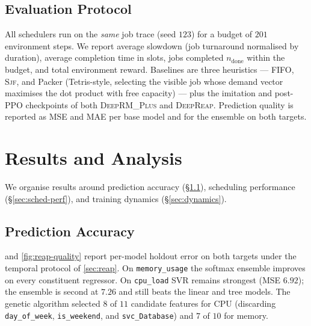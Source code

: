 \documentclass[runningheads]{llncs}
\newcommand{\deeprm}{\textsc{DeepRM\_Plus}}
\newcommand{\deepreap}{\textsc{DeepReap}}
\newcommand{\sjf}{\textsc{Sjf}}
\begin{document}
\subsection{Evaluation Protocol}\label{sec:metrics}
All schedulers run on the \emph{same} job trace (seed $123$) for a
budget of $201$ environment steps. We report average slowdown (job
turnaround normalised by duration), average completion time in slots,
jobs completed $n_{\text{done}}$ within the budget, and total
environment reward. Baselines are three heuristics --- FIFO, \sjf{}, and
Packer (Tetris-style, selecting the visible job whose demand vector
maximises the dot product with free capacity) --- plus the imitation and
post-PPO checkpoints of both \deeprm{} and \deepreap{}. Prediction
quality is reported as MSE and MAE per base model and for the ensemble
on both targets.

\section{Results and Analysis}
We organise results around prediction accuracy
(\S\ref{sec:pred-perf}), scheduling performance
(\S\ref{sec:sched-perf}), and training dynamics
(\S\ref{sec:dynamics}).

\subsection{Prediction Accuracy}\label{sec:pred-perf}
 and \cref{fig:reap-quality} report per-model holdout
error on both targets under the temporal protocol of \cref{sec:reap}.
On \texttt{memory\_usage} the softmax ensemble improves on every
constituent regressor. On \texttt{cpu\_load} SVR remains strongest
(MSE $6.92$); the ensemble is second at $7.26$ and still beats the
linear and tree models. The genetic algorithm selected $8$ of $11$
candidate features for CPU (discarding \texttt{day\_of\_week},
\texttt{is\_weekend}, and \texttt{svc\_Database}) and $7$ of $10$ for
memory.
\end{document}
